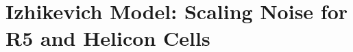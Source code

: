 \documentclass[../main.tex]{subfiles}
\begin{document}
\section{Izhikevich Model: Scaling Noise for R5 and Helicon Cells}
\end{document}
